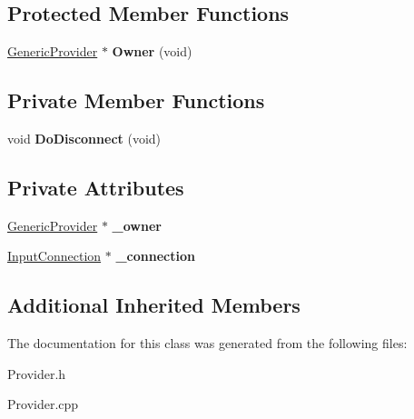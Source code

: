 \subsection*{Protected Member Functions}
\begin{DoxyCompactItemize}
\item 
\mbox{\label{class_generic_provider_1_1_input_abbdae40ca57e0b9ac93caec0ff9f811c}} 
\hyperlink{class_generic_provider}{Generic\+Provider} $\ast$ {\bfseries Owner} (void)
\end{DoxyCompactItemize}
\subsection*{Private Member Functions}
\begin{DoxyCompactItemize}
\item 
\mbox{\label{class_generic_provider_1_1_input_a865caf97ec99e4272f1eb1bb7472ae84}} 
void {\bfseries Do\+Disconnect} (void)
\end{DoxyCompactItemize}
\subsection*{Private Attributes}
\begin{DoxyCompactItemize}
\item 
\mbox{\label{class_generic_provider_1_1_input_a325fa3b2b9ad99a5353e7aa28ba63689}} 
\hyperlink{class_generic_provider}{Generic\+Provider} $\ast$ {\bfseries \+\_\+owner}
\item 
\mbox{\label{class_generic_provider_1_1_input_a3b3b207c304cad64c2e9befc5cac88e8}} 
\hyperlink{class_generic_provider_1_1_input_connection}{Input\+Connection} $\ast$ {\bfseries \+\_\+connection}
\end{DoxyCompactItemize}
\subsection*{Additional Inherited Members}


The documentation for this class was generated from the following files\+:\begin{DoxyCompactItemize}
\item 
Provider.\+h\item 
Provider.\+cpp\end{DoxyCompactItemize}

